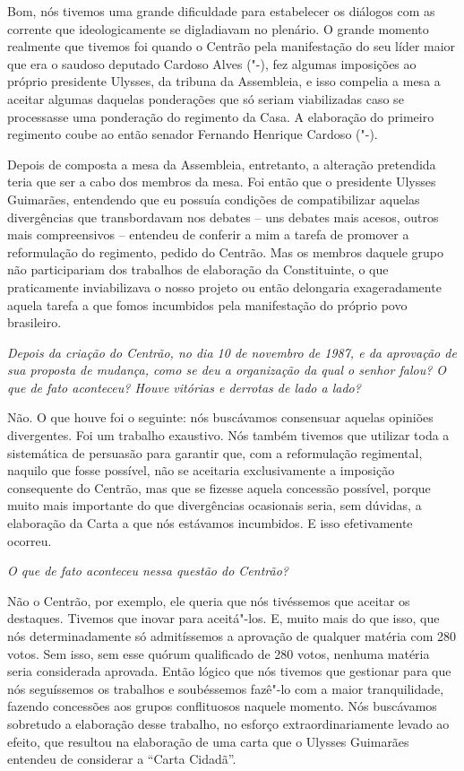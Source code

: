 Bom, nós tivemos uma grande dificuldade para
estabelecer os diálogos com as corrente que ideologicamente se
digladiavam no plenário. O grande momento realmente que tivemos foi
quando o Centrão pela manifestação do seu líder maior que era o saudoso
deputado Cardoso Alves ("-), fez algumas imposições ao próprio
presidente Ulysses, da tribuna da Assembleia, e isso compelia a mesa a
aceitar algumas daquelas ponderações que só seriam viabilizadas caso se
processasse uma ponderação do regimento da Casa. A elaboração do
primeiro regimento coube ao então senador Fernando Henrique Cardoso
("-).

Depois de composta a mesa da Assembleia, entretanto, a alteração
pretendida teria que ser a cabo dos membros da mesa. Foi então que o
presidente Ulysses Guimarães, entendendo que eu possuía condições de
compatibilizar aquelas divergências que transbordavam nos debates -- uns
debates mais acesos, outros mais compreensivos -- entendeu de conferir a
mim a tarefa de promover a reformulação do regimento, pedido do Centrão.
Mas os membros daquele grupo não participariam dos trabalhos de
elaboração da Constituinte, o que praticamente inviabilizava o nosso
projeto ou então delongaria exageradamente aquela tarefa a que fomos
incumbidos pela manifestação do próprio povo brasileiro.

\medskip

\noindent\emph{Depois da criação do Centrão, no dia 10 de novembro de 1987, e
da aprovação de sua proposta de mudança, como se deu a organização da
qual o senhor falou? O que de fato aconteceu? Houve vitórias e derrotas
de lado a lado?}

Não. O que houve foi o seguinte: nós buscávamos
consensuar aquelas opiniões divergentes. Foi um trabalho exaustivo. Nós
também tivemos que utilizar toda a sistemática de persuasão para
garantir que, com a reformulação regimental, naquilo que fosse possível,
não se aceitaria exclusivamente a imposição consequente do Centrão, mas
que se fizesse aquela concessão possível, porque muito mais importante
do que divergências ocasionais seria, sem dúvidas, a elaboração da Carta
a que nós estávamos incumbidos. E isso efetivamente ocorreu.

\medskip

\noindent\emph{O que de fato aconteceu nessa questão do Centrão?}

Não o Centrão, por exemplo, ele queria que nós
tivéssemos que aceitar os destaques. Tivemos que inovar para aceitá"-los.
E, muito mais do que isso, que nós determinadamente só admitíssemos a
aprovação de qualquer matéria com 280 votos. Sem isso, sem esse quórum
qualificado de 280 votos, nenhuma matéria seria considerada aprovada.
Então lógico que nós tivemos que gestionar para que nós seguíssemos os
trabalhos e soubéssemos fazê"-lo com a maior tranquilidade, fazendo
concessões aos grupos conflituosos naquele momento. Nós buscávamos
sobretudo a elaboração desse trabalho, no esforço extraordinariamente
levado ao efeito, que resultou na elaboração de uma carta que o Ulysses
Guimarães entendeu de considerar a ``Carta Cidadã''.

